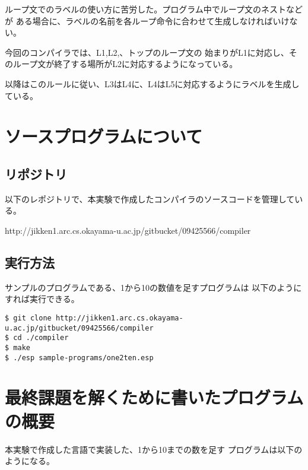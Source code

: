 \documentclass[11pt,a4j]{jarticle}
\begin{document}
ループ文でのラベルの使い方に苦労した。プログラム中でループ文のネストなどが
ある場合に、ラベルの名前を各ループ命令に合わせて生成しなければいけない。

今回のコンパイラでは、L1,L2,、トップのループ文の
始まりがL1に対応し、そのループ文が終了する場所がL2に対応するようになっている。

以降はこのルールに従い、L3はL4に、L4はL5に対応するようにラベルを生成している。




\section{ソースプログラムについて}

\subsection{リポジトリ}

以下のレポジトリで、本実験で作成したコンパイラのソースコードを管理している。

http://jikken1.arc.cs.okayama-u.ac.jp/gitbucket/09425566/compiler


\subsection{実行方法}

サンプルのプログラムである、1から10の数値を足すプログラムは
以下のようにすれば実行できる。

\begin{verbatim}
$ git clone http://jikken1.arc.cs.okayama-u.ac.jp/gitbucket/09425566/compiler
$ cd ./compiler
$ make 
$ ./esp sample-programs/one2ten.esp
\end{verbatim}



\section{最終課題を解くために書いたプログラムの概要}

本実験で作成した言語で実装した、1から10までの数を足す
プログラムは以下のようになる。

\vspace{0.2in}


\end{document}

